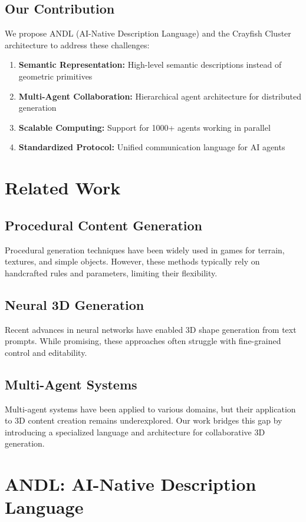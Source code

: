 \documentclass[11pt,a4paper]{article}
\begin{document}
\subsection{Our Contribution}
We propose ANDL (AI-Native Description Language) and the Crayfish Cluster architecture to address these challenges:
\begin{enumerate}
    \item \textbf{Semantic Representation:} High-level semantic descriptions instead of geometric primitives
    \item \textbf{Multi-Agent Collaboration:} Hierarchical agent architecture for distributed generation
    \item \textbf{Scalable Computing:} Support for 1000+ agents working in parallel
    \item \textbf{Standardized Protocol:} Unified communication language for AI agents
\end{enumerate}

\section{Related Work}
\subsection{Procedural Content Generation}
Procedural generation techniques have been widely used in games for terrain, textures, and simple objects. However, these methods typically rely on handcrafted rules and parameters, limiting their flexibility.

\subsection{Neural 3D Generation}
Recent advances in neural networks have enabled 3D shape generation from text prompts. While promising, these approaches often struggle with fine-grained control and editability.

\subsection{Multi-Agent Systems}
Multi-agent systems have been applied to various domains, but their application to 3D content creation remains underexplored. Our work bridges this gap by introducing a specialized language and architecture for collaborative 3D generation.

\section{ANDL: AI-Native Description Language}
\end{document}
